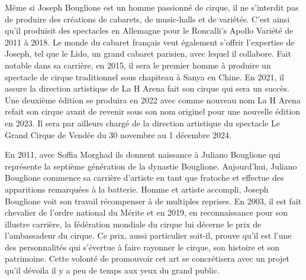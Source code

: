 Même si Joseph Bouglione est un homme passionné de cirque, il ne s’interdit pas de produire des créations de cabarets, de music-halls et de variétés. C’est ainsi qu’il produisit des spectacles en Allemagne pour le Roncalli’s Apollo Variété de 2011 à 2018. Le monde du cabaret français veut également s’offrir l’expertise de Joseph, tel que le Lido, un grand cabaret parisien, avec lequel il collabore. Fait notable dans sa carrière, en 2015, il sera le premier homme à produire un spectacle de cirque traditionnel sous chapiteau à Sanya en Chine. En 2021, il assure la direction artistique de La H Arena fait son cirque qui sera un succès. Une deuxième édition se produira en 2022 avec comme nouveau nom La H Arena refait son cirque avant de revenir sous son nom originel pour une nouvelle édition en 2023. Il sera par ailleurs chargé de la direction artistique du spectacle Le Grand Cirque de Vendée du 30 novembre au 1 décembre 2024.

En 2011, avec Soffia Morghad ils donnent naissance à Juliano Bouglione qui représente la septième génération de la dynastie Bouglione. Aujourd’hui, Juliano Bouglione commence sa carrière d’artiste en tant que fratoche et effectue des apparitions remarquées à la batterie. Homme et artiste accompli, Joseph Bouglione voit son travail récompenser à de multiples reprises. En 2003, il est fait chevalier de l’ordre national du Mérite et en 2019, en reconnaissance pour son illustre carrière, la fédération mondiale du cirque lui décerne le prix de l’ambassadeur du cirque. Ce prix, aussi particulier soit-il, prouve qu'il est l’une des personnalités qui s’évertue à faire rayonner le cirque, son histoire et son patrimoine. Cette volonté de promouvoir cet art se concrétisera avec un projet qu’il dévoila il y a peu de temps aux yeux du grand public.

